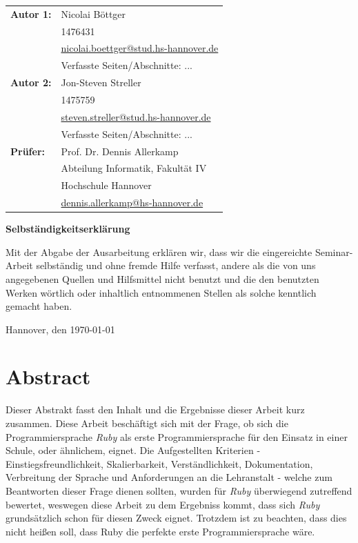 \documentclass[12pt,DIV=14, version=first, BCOR=10mm,a4paper,twoside,parskip=half-,headsepline,headinclude]{scrartcl}
\begin{document}
  \newpage \thispagestyle{empty}
 \begin{tabular}{ll}
{\bfseries\sffamily Autor 1:} &  Nicolai Böttger \\
            & 1476431 \\
            & \href{mailto:nicolai.boettger@stud.hs-hannover.de}{nicolai.boettger@stud.hs-hannover.de} \\
            & Verfasste Seiten/Abschnitte: ...
            \\[5ex]
{\bfseries\sffamily Autor 2:} & Jon-Steven Streller \\
            & 1475759 \\
            & \href{mailto:steven.streller@stud.hs-hannover.de}{steven.streller@stud.hs-hannover.de} \\
           & Verfasste Seiten/Abschnitte: ... \\[5ex]
 {\bfseries\sffamily Prüfer:} &Prof. Dr. Dennis Allerkamp \\
          & Abteilung Informatik, Fakultät IV \\
         & Hochschule Hannover \\
        & \href{mailto:dennis.allerkamp@hs-hannover.de}{dennis.allerkamp@hs-hannover.de}
\end{tabular}

\vfill

\begin{center} \sffamily\bfseries Selbständigkeitserklärung \end{center}

Mit der Abgabe der Ausarbeitung erklären wir, dass wir die eingereichte Seminar-Arbeit
selbständig und ohne fremde Hilfe verfasst, andere als die von uns angegebenen Quellen
und Hilfsmittel nicht benutzt und die den benutzten Werken wörtlich oder
inhaltlich entnommenen Stellen als solche kenntlich gemacht haben.
\vspace*{7ex}

Hannover, den \today \hfill

\pagebreak
\section{Abstract}
\begin{flushleft}
Dieser Abstrakt fasst den Inhalt und die Ergebnisse dieser Arbeit kurz zusammen. Diese Arbeit beschäftigt sich mit der Frage, ob sich die Programmiersprache \textit{\glqq Ruby\grqq} als erste Programmiersprache für den Einsatz in einer Schule, oder ähnlichem, eignet. Die Aufgestellten Kriterien - Einstiegsfreundlichkeit, Skalierbarkeit, Verständlichkeit, Dokumentation, Verbreitung der Sprache und Anforderungen an die Lehranstalt - welche zum Beantworten dieser Frage dienen sollten, wurden für \textit{\glqq Ruby\grqq} überwiegend zutreffend bewertet, weswegen diese Arbeit zu dem Ergebniss kommt, dass sich \textit{\glqq Ruby\grqq} grundsätzlich schon für diesen Zweck eignet. Trotzdem ist zu beachten, dass dies nicht heißen soll, dass Ruby die perfekte erste Programmiersprache wäre.
\end{flushleft}
\end{document}
